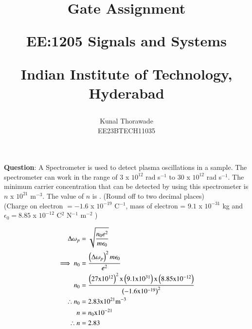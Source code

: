 \documentclass[journal,12pt,twocolumn]{IEEEtran}
\theoremstyle{remark}
\begin{document}
%




\vspace{3cm}

\title{
Gate Assignment

\large{EE:1205 Signals and Systems}

Indian Institute of Technology, Hyderabad
}
\author{Kunal Thorawade

EE23BTECH11035
}	
\maketitle


\newpage


\bigskip
 
 \renewcommand{\thefigure}{\theenumi}
 \renewcommand{\thetable}{\arabic{table}}
 \renewcommand{\thefigure}{\arabic{figure}}

 \textbf{Question}:
 A Spectrometer is used to detect plasma oscillations in a sample. The spectrometer 
 can work in the range of $3$ x $10^{12}$ rad s$^{-1}$ to $30$ x $10^{12}$ rad s$^{-1}$. The minimum carrier concentration that can be detected by using this spectrometer is $n$ x $10^{21}$ m$^{-3}$. The value of $n$ is \underline{\hspace{2cm}}. (Round off to two decimal places) \\
 (Charge on electron $= -1.6$ x $10^{-19} $ C$^{-1}$, mass of electron = $9.1$ x $10^{-31}$ kg and $\epsilon_0 = 8.85$ x $10^{-12}$ C$^{2}$ N$^{-1}$ m$^{-2}$ ) \\
 \solution 
 
 \begin{align}
     \Delta\omega_p &= \sqrt{\frac{n_0e^2}{m\epsilon_0}} \\
         \implies n_0 &= \frac{\left(\Delta\omega_p\right)^2m\epsilon_0}{e^2} \\
	     n_0 &= \frac{\left(27 \text{x} 10^{12}\right)^2 \text{x} \left(9.1 \text{x} 10^{31} \right)\text{x} \left(8.85 \text{x} 10^{-12}\right)}{\left(-1.6 \text{x} 10^{-19}\right)^2} \\
	         \therefore n_0 &= 2.83 \text{x} 10^{21} \text{m}^{-3} \\
		     n &= n_0 \text{x} 10^{-21} \\
		         \therefore n &= 2.83
			 \end{align}
			 
\end{document}
